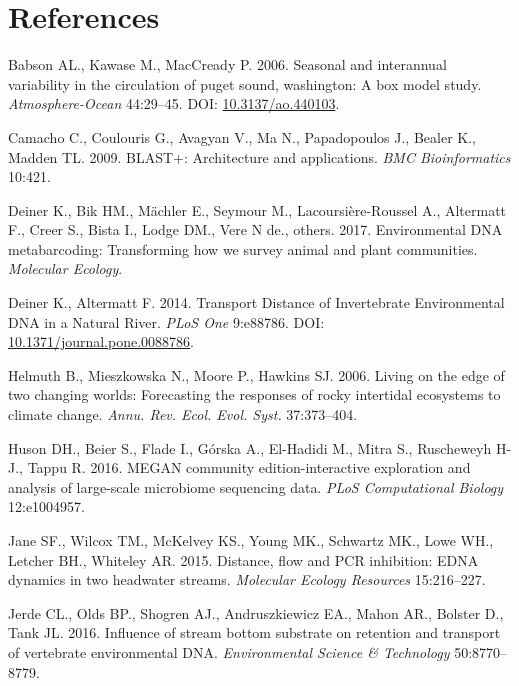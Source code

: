 \documentclass[fleqn,10pt,lineno]{wlpeerj} %
\begin{document}
\newpage

\section*{References}\label{references}

\hypertarget{refs}{}
\hypertarget{ref-Babson2006}{}
Babson AL., Kawase M., MacCready P. 2006. Seasonal and interannual
variability in the circulation of puget sound, washington: A box model
study. \emph{Atmosphere-Ocean} 44:29--45. DOI:
\href{https://doi.org/10.3137/ao.440103}{10.3137/ao.440103}.

\hypertarget{ref-camacho2009blast}{}
Camacho C., Coulouris G., Avagyan V., Ma N., Papadopoulos J., Bealer K.,
Madden TL. 2009. BLAST+: Architecture and applications. \emph{BMC
Bioinformatics} 10:421.

\hypertarget{ref-deiner2017environmental}{}
Deiner K., Bik HM., Mächler E., Seymour M., Lacoursière-Roussel A.,
Altermatt F., Creer S., Bista I., Lodge DM., Vere N de., others. 2017.
Environmental DNA metabarcoding: Transforming how we survey animal and
plant communities. \emph{Molecular Ecology}.

\hypertarget{ref-deiner_transport_2014-1}{}
Deiner K., Altermatt F. 2014. Transport Distance of Invertebrate
Environmental DNA in a Natural River. \emph{PLoS One} 9:e88786. DOI:
\href{https://doi.org/10.1371/journal.pone.0088786}{10.1371/journal.pone.0088786}.

\hypertarget{ref-helmuth2006living}{}
Helmuth B., Mieszkowska N., Moore P., Hawkins SJ. 2006. Living on the
edge of two changing worlds: Forecasting the responses of rocky
intertidal ecosystems to climate change. \emph{Annu. Rev. Ecol. Evol.
Syst.} 37:373--404.

\hypertarget{ref-huson2016megan}{}
Huson DH., Beier S., Flade I., Górska A., El-Hadidi M., Mitra S.,
Ruscheweyh H-J., Tappu R. 2016. MEGAN community edition-interactive
exploration and analysis of large-scale microbiome sequencing data.
\emph{PLoS Computational Biology} 12:e1004957.

\hypertarget{ref-jane2015distance}{}
Jane SF., Wilcox TM., McKelvey KS., Young MK., Schwartz MK., Lowe WH.,
Letcher BH., Whiteley AR. 2015. Distance, flow and PCR inhibition: EDNA
dynamics in two headwater streams. \emph{Molecular Ecology Resources}
15:216--227.

\hypertarget{ref-jerde2016influence}{}
Jerde CL., Olds BP., Shogren AJ., Andruszkiewicz EA., Mahon AR., Bolster
D., Tank JL. 2016. Influence of stream bottom substrate on retention and
transport of vertebrate environmental DNA. \emph{Environmental Science
\& Technology} 50:8770--8779.
\end{document}
